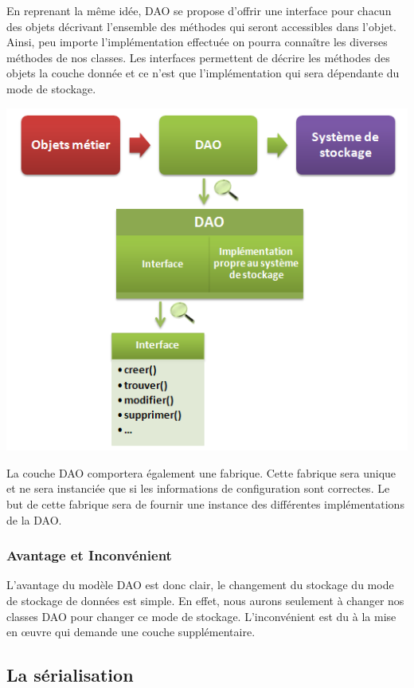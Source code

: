 En reprenant la même idée, DAO se propose d'offrir une interface pour chacun des objets décrivant l'ensemble des méthodes qui seront accessibles dans l'objet. Ainsi, peu importe l'implémentation effectuée on pourra connaître les diverses méthodes de nos classes. Les interfaces permettent de décrire les méthodes des objets la couche donnée et ce n'est que l'implémentation qui sera dépendante du mode de stockage. \\ 
\begin{center}
\includegraphics[scale=0.5]{../graph/dao2.png} \\
\end{center}

La couche DAO comportera également une fabrique. Cette fabrique sera unique et ne sera instanciée que si les informations de configuration sont correctes. Le but de cette fabrique sera de fournir une instance des différentes implémentations de la DAO.

\subsubsection{Avantage et Inconvénient}
L'avantage du modèle DAO est donc clair, le changement du stockage du mode de stockage de données est simple. En effet, nous aurons seulement à changer nos classes DAO pour changer ce mode de stockage. L'inconvénient est du à la mise en œuvre qui demande une couche supplémentaire. 


\subsection{La sérialisation}

